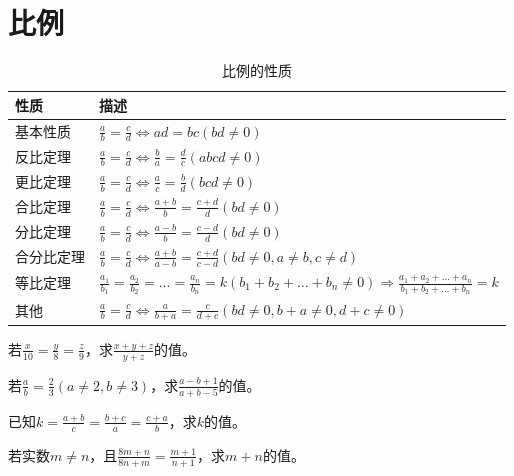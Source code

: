 \section{比例}
\begin{table}[H]
    \centering
    \caption{比例的性质}
    \begin{tabular}{l|p{12cm}}
        \hline
        \hline
        性质    & 描述                                                                                                                                   \\
        \hline
        基本性质  & $ \frac{a}{b}=\frac{c}{d}\Leftrightarrow ad=bc(bd \ne 0) $                                                                           \\
        \hline
        反比定理  & $ \frac{a}{b}=\frac{c}{d}\Leftrightarrow \frac{b}{a}=\frac{d}{c}(abcd \ne 0) $                                                       \\
        \hline
        更比定理  & $ \frac{a}{b}=\frac{c}{d}\Leftrightarrow \frac{a}{c}=\frac{b}{d}(bcd \ne 0) $                                                        \\
        \hline
        合比定理  & $ \frac{a}{b}=\frac{c}{d}\Leftrightarrow \frac{a+b}{b}=\frac{c+d}{d}(bd \ne 0) $                                                     \\
        \hline
        分比定理  & $ \frac{a}{b}=\frac{c}{d}\Leftrightarrow \frac{a-b}{b}=\frac{c-d}{d}(bd \ne 0) $                                                     \\
        \hline
        合分比定理 & $ \frac{a}{b}=\frac{c}{d}\Leftrightarrow \frac{a+b}{a-b}=\frac{c+d}{c-d}(bd \ne 0,a\ne b,c\ne d) $                                   \\
        \hline
        等比定理  & $ \frac{a_1}{b_1}=\frac{a_2}{b_2}=...=\frac{a_n}{b_n}=k(b_1+b_2+...+b_n\ne 0)\Rightarrow \frac{a_1+a_2+...+a_n}{b_1+b_2+...+b_n}=k $ \\
        \hline
        其他    & $\frac{a}{b}=\frac{c}{d}\Leftrightarrow \frac{a}{b+a}=\frac{c}{d+c}(bd \ne 0,b+a\ne 0,d+c \ne 0)$                                    \\
        \hline
        \hline
    \end{tabular}
\end{table}
\begin{problem}
若$\frac{x}{10}=\frac{y}{8}=\frac{z}{9}$，求$\frac{x+y+z}{y+z}$的值。\\
\end{problem}
\begin{problem}
若$\frac{a}{b}=\frac{2}{3}(a\ne 2,b\ne 3)$，求$\frac{a-b+1}{a+b-5}$的值。\\
\end{problem}
\begin{problem}
已知$k=\frac{a+b}{c}=\frac{b+c}{a}=\frac{c+a}{b}$，求$k$的值。\\
\end{problem}
\begin{problem}
若实数$m\ne n$，且$\frac{8m+n}{8n+m}=\frac{m+1}{n+1}$，求$m+n$的值。 \\
\end{problem}
\clearpage
